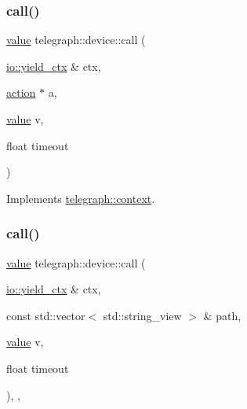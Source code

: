 \subsubsection{\texorpdfstring{call()}{call()}\hspace{0.1cm}{\footnotesize\ttfamily [1/2]}}
{\footnotesize\ttfamily \hyperlink{classtelegraph_1_1value}{value} telegraph\+::device\+::call (\begin{DoxyParamCaption}\item[{\hyperlink{structboost_1_1asio_1_1yield__ctx}{io\+::yield\+\_\+ctx} \&}]{ctx,  }\item[{\hyperlink{classtelegraph_1_1action}{action} $\ast$}]{a,  }\item[{\hyperlink{classtelegraph_1_1value}{value}}]{v,  }\item[{float}]{timeout }\end{DoxyParamCaption})\hspace{0.3cm}{\ttfamily [virtual]}}



Implements \hyperlink{classtelegraph_1_1context_a72da471eb635e5505b10d2f1103359ac}{telegraph\+::context}.

\mbox{\label{classtelegraph_1_1device_a581368ab8f35ef72db17d2e330ded068}} 
\subsubsection{\texorpdfstring{call()}{call()}\hspace{0.1cm}{\footnotesize\ttfamily [2/2]}}
{\footnotesize\ttfamily \hyperlink{classtelegraph_1_1value}{value} telegraph\+::device\+::call (\begin{DoxyParamCaption}\item[{\hyperlink{structboost_1_1asio_1_1yield__ctx}{io\+::yield\+\_\+ctx} \&}]{ctx,  }\item[{const std\+::vector$<$ std\+::string\+\_\+view $>$ \&}]{path,  }\item[{\hyperlink{classtelegraph_1_1value}{value}}]{v,  }\item[{float}]{timeout }\end{DoxyParamCaption})\hspace{0.3cm}{\ttfamily [inline]}, {\ttfamily [override]}, {\ttfamily [virtual]}}



